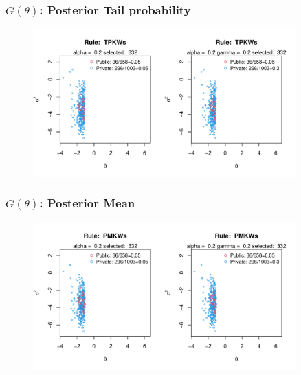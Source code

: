 \documentclass[10pt,mathserif,aspectratio=169]{beamer}
\begin{document}

\begin{frame}[label=tpselect]
  \frametitle{$G(\theta)$: Posterior Tail probability}
  \begin{figure}
    \centering
    \includegraphics[width=0.9\textwidth]{../../Figures/2013-2022/GMM_m/GLmix/Left_0.2_0.2_TPKWs.pdf}
  \end{figure}
  \hyperlink{tpcontour}{}
\end{frame}

\begin{frame}
  \frametitle{$G(\theta)$: Posterior Mean}
  \begin{figure}
    \centering
    \includegraphics[width=0.9\textwidth]{../../Figures/2013-2022/GMM_m/GLmix/Left_0.2_0.2_PMKWs.pdf}
  \end{figure}
\end{frame}
\end{document}
